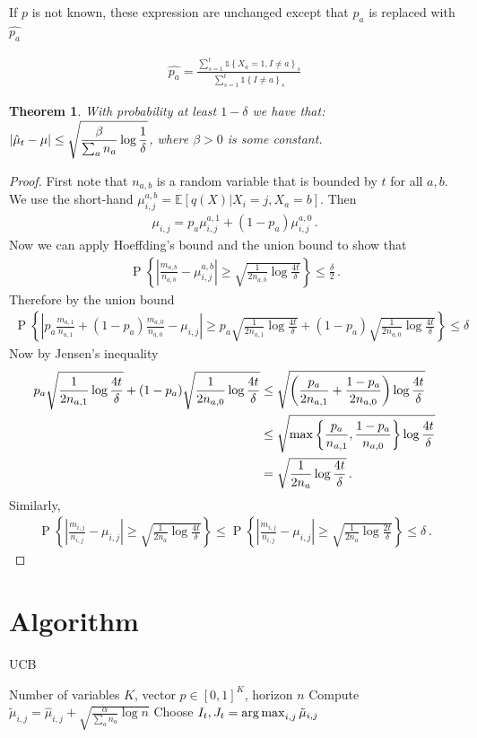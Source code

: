 \documentclass{article}
\newcommand{\E}{\mathbb E}
\newcommand{\set}[1]{\left\{#1\right\}}
\newcommand{\ind}[1]{\mathds{1}\!\!\set{#1}}
\newcommand{\argmax}{\operatornamewithlimits{arg\,max}}
\newcommand{\eq}[1]{\begin{align*}#1\end{align*}}
\renewcommand{\P}[1]{\operatorname{P}\left\{#1\right\}}
\theoremstyle{plain}
\newtheorem{theorem}{Theorem}
\theoremstyle{definition}
\begin{document}
If $p$ is not known, these expression are unchanged except that $p_a$ is replaced with $\hat{p_a}$

\eq{
\hat{p_a} = \frac{\sum_{s=1}^{t} \ind{X_a=1,I \neq a}_s}{\sum_{s=1}^{t} \ind{I \neq a}_s}
}

\begin{theorem} With probability at least $1 - \delta$ we have that:
$\displaystyle \left|\hat{\mu}_t - \mu\right| \leq \sqrt{\frac{\beta}{\sum_{a} n_a} \log{1 \over \delta}}$,
where $\beta > 0$ is some constant.
\end{theorem}

\begin{proof}
First note that $n_{a,b}$ is a random variable that is bounded by $t$ for all $a,b$.
We use the short-hand $\mu^{a,b}_{i,j} = \E[q(X) | X_i = j, X_a = b]$. Then
\eq{
\mu_{i,j} = p_a \mu_{i,j}^{a,1} + (1 - p_a) \mu_{i,j}^{a,0}\,.
}
Now we can apply Hoeffding's bound and the union bound to show that
\eq{
\P{\left|\frac{m_{a,b}}{n_{a,b}} - \mu_{i,j}^{a,b}\right| \geq \sqrt{\frac{1}{2n_{a,b}} \log \frac{4t}{\delta}}} \leq \frac{\delta}{2}\,.
}
Therefore by the union bound
\eq{
\P{\left|p_a \frac{m_{a,1}}{n_{a,1}} + (1 - p_a) \frac{m_{a,0}}{n_{a,0}} - \mu_{i,j}\right| \geq p_a \sqrt{\frac{1}{2n_{a,1}} \log\frac{4t}{\delta}}
+ (1 - p_a) \sqrt{\frac{1}{2n_{a,0}}\log\frac{4t}{\delta}}} \leq \delta\,
}
Now by Jensen's inequality 
\eq{
p_a \sqrt{\frac{1}{2n_{a,1}}\log\frac{4t}{\delta}} + (1 - p_a) \sqrt{\frac{1}{2n_{a,0}}\log\frac{4t}{\delta}}
&\leq \sqrt{\left(\frac{p_a}{2n_{a,1}} + \frac{1-p_a}{2n_{a,0}}\right)\log \frac{4t}{\delta}} \\
&\leq \sqrt{\max\set{\frac{p_a}{n_{a,1}}, \frac{1-p_a}{n_{a,0}}} \log\frac{4t}{\delta}} \\
&= \sqrt{{1 \over 2n_a} \log\frac{4t}{\delta}}\,.
}
Similarly,
\eq{
\P{\left|\frac{m_{i,j}}{n_{i,j}} - \mu_{i,j}\right| \geq \sqrt{\frac{1}{2n_a} \log\frac{4t}{\delta}}} \leq
\P{\left|\frac{m_{i,j}}{n_{i,j}} - \mu_{i,j}\right| \geq \sqrt{\frac{1}{2n_a} \log\frac{2t}{\delta}}} \leq \delta\,.
}
\end{proof}

\section{Algorithm}

\begin{algorithm}
\caption{UCB}
\begin{algorithmic}[1]
 Number of variables $K$, vector $p \in [0,1]^K$, horizon $n$
\For{$j \in \set{0,1}$}
\State Compute $\tilde \mu_{i,j} = \hat \mu_{i,j} + \sqrt{\frac{\alpha}{\sum_{a} n_a} \log n}$ 
\EndFor
\EndFor
\State Choose $I_t, J_t = \argmax_{i,j} \tilde \mu_{i,j}$
\EndFor
\end{algorithmic}
\end{algorithm}
\end{document}
